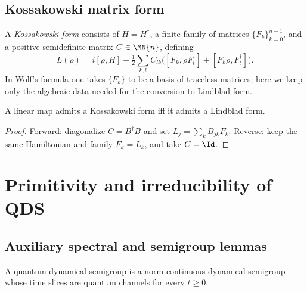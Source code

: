 \subsection{Kossakowski matrix form}

\begin{definition}\label{def:kossakowski_form}
    \leanok
    A \emph{Kossakowski form} consists of $H = H^\dagger$, a finite family
    of matrices $\{F_k\}_{k=0}^{n-1}$, and a positive semidefinite matrix
    $C \in \MN{n}$, defining
    \[
        L(\rho)
        = i[\rho, H]
        + \tfrac{1}{2}\sum_{k,l} C_{lk}\bigl(    [F_k, \rho F_l^\dagger] + [F_k\rho, F_l^\dagger]
        \bigr).
    \]
    In Wolf's formula one takes $\{F_k\}$ to be a basis of traceless matrices;
    here we keep only the algebraic data needed for the conversion to
    Lindblad form.
\end{definition}

\begin{theorem}
    \label{thm:kossakowski_iff_lindblad}
    \leanok
    A linear map admits a Kossakowski form iff it admits a Lindblad form.
\end{theorem}

\begin{proof}
    \leanok
    Forward: diagonalize $C = B^\dagger B$ and set
    $L_j = \sum_k B_{jk} F_k$.
    Reverse: keep the same Hamiltonian and family $F_k = L_k$, and take
    $C = \Id$.
\end{proof}

\section{Primitivity and irreducibility of QDS}
\label{sec:qds_primitivity}

\subsection{Auxiliary spectral and semigroup lemmas}

\begin{definition}
    \label{def:is_quantum_dyn_semigroup_ch12}
    \leanok
    A quantum dynamical semigroup is a norm-continuous dynamical semigroup whose
    time slices are quantum channels for every $t \ge 0$.
\end{definition}

